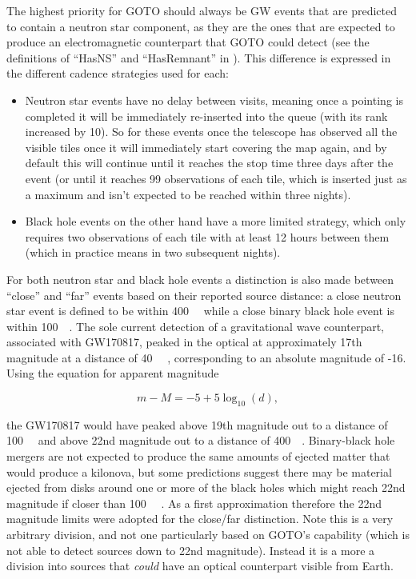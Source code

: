 \begin{colsection}
\begin{colsection}
The highest priority for GOTO should always be GW events that are predicted to contain a neutron star component, as they are the ones that are expected to produce an electromagnetic counterpart that GOTO could detect (see the definitions of ``HasNS'' and ``HasRemnant'' in ). This difference is expressed in the different cadence strategies used for each:

\begin{itemize}
    \item Neutron star events have no delay between visits, meaning once a pointing is completed it will be immediately re-inserted into the queue (with its rank increased by 10). So for these events once the telescope has observed all the visible tiles once it will immediately start covering the map again, and by default this will continue until it reaches the stop time three days after the event (or until it reaches 99 observations of each tile, which is inserted just as a maximum and isn't expected to be reached within three nights).
    \item Black hole events on the other hand have a more limited  strategy, which only requires two observations of each tile with at least 12 hours between them (which in practice means in two subsequent nights).
\end{itemize}

For both neutron star and black hole events a distinction is also made between ``close'' and ``far'' events based on their reported source distance: a close neutron star event is defined to be within \SI{400}{\mega\parsec} while a close binary black hole event is within \SI{100}{\mega\parsec}. The sole current detection of a gravitational wave counterpart, associated with GW170817, peaked in the optical at approximately 17th magnitude at a distance of \SI{40}{\mega\parsec} \citep{GW170817_followup}, corresponding to an absolute magnitude of -16. Using the equation for apparent magnitude

\begin{equation}
    m-M = -5 +5\log_{10}(d),
    \label{eq:absolute_magnitude}
\end{equation}

the GW170817 would have peaked above 19th magnitude out to a distance of \SI{100}{\mega\parsec} and above 22nd magnitude out to a distance of \SI{400}{\mega\parsec}. Binary-black hole mergers are not expected to produce the same amounts of ejected matter that would produce a kilonova, but some predictions suggest there may be material ejected from disks around one or more of the black holes which might reach 22nd magnitude if closer than \SI{100}{\mega\parsec} \citep{BBH_EM, BBH_Gompertz}. As a first approximation therefore the 22nd magnitude limits were adopted for the close/far distinction. Note this is a very arbitrary division, and not one particularly based on GOTO's capability (which is not able to detect sources down to 22nd magnitude). Instead it is a more a division into sources that \textit{could} have an optical counterpart visible from Earth.


\end{colsection}
\end{colsection}
